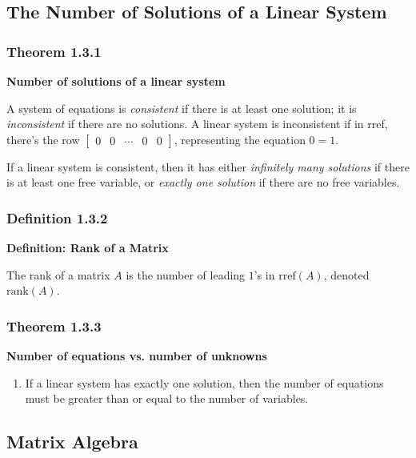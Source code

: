 \documentclass{report}
\begin{document}
\subsection*{The Number of Solutions of a Linear System}
\subsubsection*{Theorem 1.3.1}
\par\noindent\textbf{Number of solutions of a linear system}
\par\noindent A system of equations is \textit{consistent} if there is at least one solution; it is \textit{inconsistent} if there are no solutions. A linear system is inconsistent if in rref, there's the row $\left[\begin{array}{cccc|c}0 & 0 & \cdots & 0 & 0\end{array}\right]$, representing the equation $0=1$.
\par\noindent If a linear system is consistent, then it has either \textit{infinitely many solutions} if there is at least one free variable, or \textit{exactly one solution} if there are no free variables.\\
\subsubsection*{Definition 1.3.2}
\par\noindent\textbf{Definition: Rank of a Matrix}
\par\noindent The rank of a matrix $A$ is the number of leading $1$'s in $\mathrm{rref}(A)$, denoted $\mathrm{rank}(A)$.\\
\subsubsection*{Theorem 1.3.3}
\par\noindent\textbf{Number of equations vs. number of unknowns}
\renewcommand{\labelenumi}{\textbf{(\alph{enumi})}}
\begin{enumerate}
\item If a linear system has exactly one solution, then the number of equations must be greater than or equal to the number of variables.
\end{enumerate}
\par\quad
\subsection*{Matrix Algebra}
\end{document}

